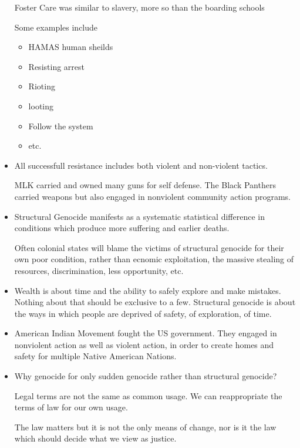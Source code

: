 \documentclass{report}
\begin{document}
\begin{itemize}
\begin{mdframed}
            Foster Care was similar to slavery,
            more so than the boarding schools
        \end{mdframed}
        \begin{mdframed}
            Some examples include
            \begin{itemize}
                \item HAMAS human sheilds
                \item Resisting arrest
                \item Rioting
                \item looting
                \item Follow the system
                \item etc.
            \end{itemize}
        \end{mdframed}
    \item All successfull resistance includes both
        violent and non-violent tactics.

        \begin{mdframed}
            MLK carried and owned many guns for
            self defense. The Black Panthers carried
            weapons but also engaged in nonviolent
            community action programs.
        \end{mdframed}

    \item Structural Genocide manifests as a systematic
        statistical difference in conditions which
        produce more suffering and earlier deaths.

        Often colonial states will blame the victims
        of structural genocide for their own poor
        condition, rather than ecnomic exploitation,
        the massive stealing of resources, discrimination,
        less opportunity, etc.

    \item Wealth is about time and the ability to safely
        explore and make mistakes. Nothing about that
        should be exclusive to a few. Structural
        genocide is about the ways in which people are
        deprived of safety, of exploration, of time.
        
    \item American Indian Movement fought the US government.
        They engaged in nonviolent action as well as
        violent action, in order to create homes and
        safety for multiple Native American Nations.

    \item Why genocide for only sudden genocide rather than
        structural genocide?
        \begin{mdframed}
            Legal terms are not the same as common
            usage. We can reappropriate the terms of
            law for our own usage.

            The law matters but it is not the only 
            means of change, nor is it the law which
            should decide what we view as justice.
        \end{mdframed}

\end{itemize}
\end{document}
